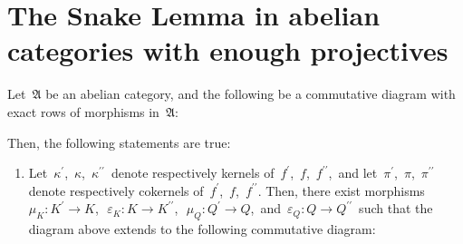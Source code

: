 

\section{The Snake Lemma in abelian categories with enough projectives}
\setcounter{theorem}{0}
\setcounter{equation}{0}


\renewcommand{\theenumi}{\roman{enumi}}
\renewcommand{\labelenumi}{\textnormal{(\theenumi)}$\;\;$}


\begin{theorem}
\mbox{}
\vskip 0.15cm
\noindent
Let \,$\mathfrak{A}$ be an abelian category, and
the following be a commutative diagram with exact rows of morphisms in \,$\mathfrak{A}$:
\begin{center}
\end{center}
Then, the following statements are true:
\begin{enumerate}
\item
	Let
	\,$\kappa^{\prime}$,\, $\kappa$,\, $\kappa^{\prime\prime}$\, 
	denote respectively kernels of
	\,$f^{\prime}$,\, $f$,\, $f^{\prime\prime}$,\,
	and let
	\,$\pi^{\prime}$,\, $\pi$,\, $\pi^{\prime\prime}$\, 
	denote  respectively cokernels of 
	\,$f^{\prime}$,\, $f$,\, $f^{\prime\prime}$.
	Then, there exist morphisms
	\,$\mu_{K} : K^{\prime} \longrightarrow K$,\,
	\,$\varepsilon_{K} : K \longrightarrow K^{\prime\prime}$,\,
	\,$\mu_{Q} : Q^{\prime} \longrightarrow Q$,\,
	and
	\,$\varepsilon_{Q} : Q \longrightarrow Q^{\prime\prime}$\,
	such that the diagram above extends to the following commutative diagram:
	\begin{center}
\end{center}
\end{enumerate}
\end{theorem}

